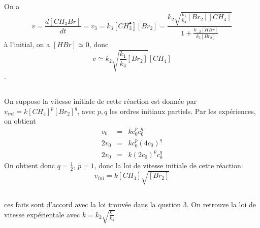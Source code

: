 \documentclass[a4paper,12pt]{book}
\begin{document}
\subsection{}
On a 
$$
v=\frac{d[CH_3Br]}{dt}=v_3=k_3[CH_3^\bullet][Br_2]=\frac{k_2\sqrt{\frac{k_1}{k_4}[Br_2][CH_4]}}{1+\frac{k_{-2}[HBr]}{k_3[Br_2]}}
$$
à l'initial, on a $[HBr]\simeq 0$, donc 
$$\boxed{v\simeq k_2\sqrt{\frac{k_1}{k_4}[Br_2]}[CH_4]}$$
.
\subsection{}
On suppose la vitesse initiale de cette réaction est donnée par $v_{ini}=k[CH_4]^p[Br_2]^q$, avec $p,q$ les 
ordres initiaux partiels. Par les expériences, on obtient 
$$
\begin{array}{lcl}
    v_0 & = & kc_0^pc_0^q\\
    2v_0 & = & kc_0^p(4c_0)^q\\
    2v_0 & = & k(2c_0)^pc_0^q
\end{array}
$$
On obtient donc $q=\frac{1}{2}$, $p=1$, donc la loi de vitesse initiale de cette réaction:
$$
\boxed{v_{ini}=k[CH_4]\sqrt{[Br_2]}}
$$
\subsection{}

ces faits sont d'accord avec la loi trouvée dans la qustion $3$. On retrouve la loi 
de vitesse expérientale avec $k=k_2\sqrt{\frac{k_1}{k_4}}$

\hspace*{\fill} 
\end{document}
